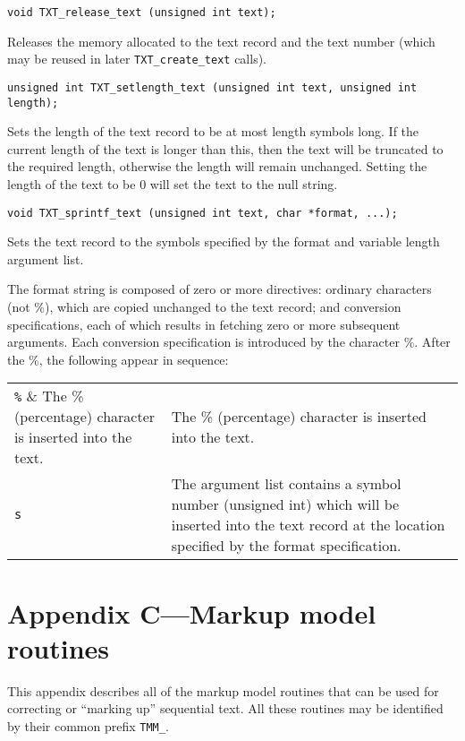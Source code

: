 \documentclass[11pt]{article}
\begin{document}
{\begin{verbatim}
void TXT_release_text (unsigned int text);
\end{verbatim}

\vspace{-0.2cm}
Releases the memory allocated to the text record and the text number (which may
be reused in later \verb|TXT_create_text| calls).

\begin{verbatim}
unsigned int TXT_setlength_text (unsigned int text, unsigned int length);
\end{verbatim}

\vspace{-0.2cm}
Sets the length of the text record to be at most length symbols long. If the
current length of the text is longer than this, then the text will be
truncated to the required length, otherwise the length will remain
unchanged. Setting the length of the text to be 0 will set the text
to the null string.

\begin{verbatim}
void TXT_sprintf_text (unsigned int text, char *format, ...);
\end{verbatim}

\vspace{-0.2cm}
Sets the text record to the symbols specified by the format and variable length
argument list.

The format string is composed of zero or more directives: ordinary characters (not \%),
which are copied unchanged to the text record;  and conversion specifications, each of
which results in fetching zero or more subsequent arguments.  Each conversion
specification is introduced by the character \%. After the \%,
the following appear in sequence:

\begin{tabular}{lp{12.8cm}}
\verb|%| & The \% (percentage) character is inserted into the text. \\
\verb|s| & The argument list contains a symbol number (unsigned int) which will be inserted into the
	   text record at the location specified by the format specification. \\
\end{tabular}

\section{Appendix C---Markup model routines}

This appendix describes all of the markup model routines that
can be used for correcting or ``marking up'' sequential text.
All these routines may be identified by their common prefix \verb|TMM_|.

}
\end{document}
